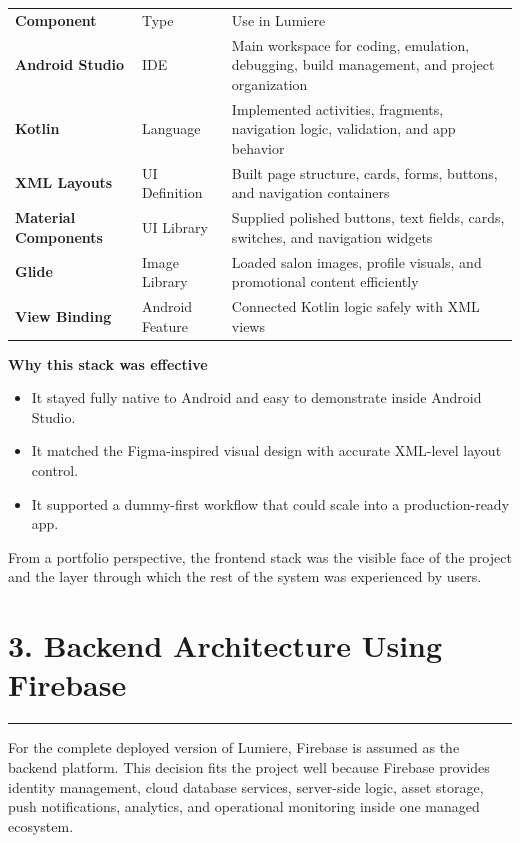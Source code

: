 \documentclass[11pt,a4paper]{article}
\newcommand{\PageTitle}[1]{\section*{#1}\vspace{2pt}\textcolor{LumiereGold}{\rule{\textwidth}{1.1pt}}\vspace{6pt}}
\newcommand{\SmallSpace}{\vspace{4pt}}
\begin{document}
\begin{tabularx}{\textwidth}{>{\bfseries}p{2.4cm} p{2.1cm} Y}
\color{white}Component & \color{white}Type & \color{white}Use in Lumiere \\
Android Studio & IDE & Main workspace for coding, emulation, debugging, build management, and project organization \\
Kotlin & Language & Implemented activities, fragments, navigation logic, validation, and app behavior \\
XML Layouts & UI Definition & Built page structure, cards, forms, buttons, and navigation containers \\
Material Components & UI Library & Supplied polished buttons, text fields, cards, switches, and navigation widgets \\
Glide & Image Library & Loaded salon images, profile visuals, and promotional content efficiently \\
View Binding & Android Feature & Connected Kotlin logic safely with XML views \\
\end{tabularx}

\SmallSpace
\begin{tcolorbox}[colback=LumiereCream,colframe=LumiereLine,boxrule=0.6pt,arc=2mm]
\textbf{\textcolor{LumiereDark}{Why this stack was effective}}
\begin{itemize}
\item It stayed fully native to Android and easy to demonstrate inside Android Studio.
\item It matched the Figma-inspired visual design with accurate XML-level layout control.
\item It supported a dummy-first workflow that could scale into a production-ready app.
\end{itemize}
\end{tcolorbox}

From a portfolio perspective, the frontend stack was the visible face of the project and the layer through which the rest of the system was experienced by users.

\newpage
\PageTitle{3. Backend Architecture Using Firebase}

For the complete deployed version of Lumiere, Firebase is assumed as the backend platform. This decision fits the project well because Firebase provides identity management, cloud database services, server-side logic, asset storage, push notifications, analytics, and operational monitoring inside one managed ecosystem.
\end{document}
